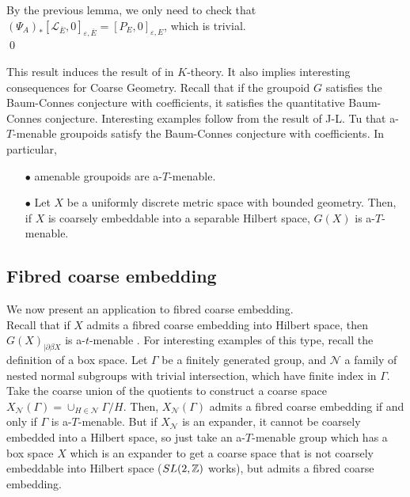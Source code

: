 \begin{dem}
By the previous lemma, we only need to check that $(\Psi_A)_*[\mathcal L_{\overline E},0]_{\varepsilon,\overline  E} = [P_{E},0]_{\varepsilon, E} $, which is trivial.\\
\qed
\end{dem}

This result induces the result of \cite{SkTuYu} in $K$-theory. It also implies interesting consequences for Coarse Geometry. Recall that if the groupoid $G$ satisfies the Baum-Connes conjecture with coefficients, it satisfies the quantitative Baum-Connes conjecture. Interesting examples follow from the result of J-L. Tu \cite{TuThese} that a-$T$-menable groupoids satisfy the Baum-Connes conjecture with coefficients. In particular, \\

\begin{itemize}
\item[$\bullet$] amenable groupoids are a-$T$-menable.\\
\item[$\bullet$] Let $X$ be a uniformly discrete metric space with bounded geometry. Then, if $X$ is coarsely embeddable into a separable Hilbert space, $G(X)$ is a-$T$-menable.\cite{SkTuYu} \\
\end{itemize}

\subsection{Fibred coarse embedding}

We now present an application to fibred coarse embedding.\\

Recall that if $X$ admits a fibred coarse embedding into Hilbert space, then $G(X)_{|\partial \beta X}$ is a-$t$-menable \cite{FinnSellFibred}. For interesting examples of this type, recall the definition of a box space. Let $\Gamma$ be a finitely generated group, and $\mathcal N$ a family of nested normal subgroups with trivial intersection, which have finite index in $\Gamma$. Take the coarse union of the quotients to construct a coarse space $X_{\mathcal N}(\Gamma)= \cup_{H\in \mathcal N } \Gamma/ H$. Then, $X_{\mathcal N}(\Gamma)$ admits a fibred coarse embedding if and only if $\Gamma$ is a-$T$-menable. But if $X_{\mathcal N}$ is an expander, it cannot be coarsely embedded into a Hilbert space, so just take an a-$T$-menable group which has a box space $X$ which is an expander to get a coarse space that is not coarsely embeddable into Hilbert space ($SL(2,\mathbb Z)$ works), but admits a fibred coarse embedding.\\

